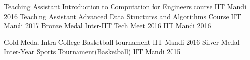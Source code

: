 \begin{cvhonors}
  \cvhonor
    {Teaching Assistant}
    {Introduction to Computation for Engineers course}
    {IIT Mandi}
    {2016}
  \cvhonor
    {Teaching Assistant}
    {Advanced Data Structures and Algorithms Course}
    {IIT Mandi}
    {2017}
  \cvhonor
    {Bronze Medal}
    {Inter-IIT Tech Meet 2016}
    {IIT Mandi}
    {2016}
\end{cvhonors}
\begin{cvhonors}
  \cvhonor
    {Gold Medal}
    {Intra-College Basketball tournament}
    {IIT Mandi}
    {2016}
  \cvhonor
    {Silver Medal}
    {Inter-Year Sports Tournament(Basketball)}
    {IIT Mandi}
    {2015}
\end{cvhonors}
